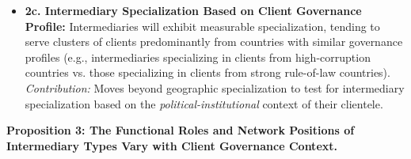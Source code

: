 \begin{itemize}[leftmargin=*]
\begin{itemize}[leftmargin=\parindent]
        \item \textbf{2c. Intermediary Specialization Based on Client Governance Profile:} Intermediaries will exhibit measurable specialization, tending to serve clusters of clients predominantly from countries with similar governance profiles (e.g., intermediaries specializing in clients from high-corruption countries vs. those specializing in clients from strong rule-of-law countries). \textit{Contribution:} Moves beyond geographic specialization to test for intermediary specialization based on the \textit{political-institutional} context of their clientele.
    \end{itemize}
\end{itemize}

\textbf{Proposition 3: The Functional Roles and Network Positions of Intermediary Types Vary with Client Governance Context.}
